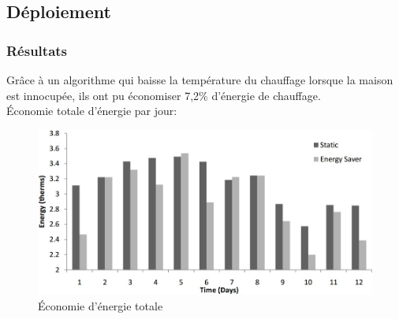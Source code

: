 \subsection{Déploiement}
\begin{frame}
 \frametitle{Résultats}
 Grâce à un algorithme qui baisse la température du chauffage lorsque la maison est innocupée, ils ont pu économiser 7,2\% d'énergie de chauffage.\\
 Économie totale d'énergie par jour:
 \begin{figure}
  \centering
  \includegraphics[scale=0.38]{figures/energysaver.jpg}
  \caption{Économie d'énergie totale}
 \end{figure} 
\end{frame}

 
 
